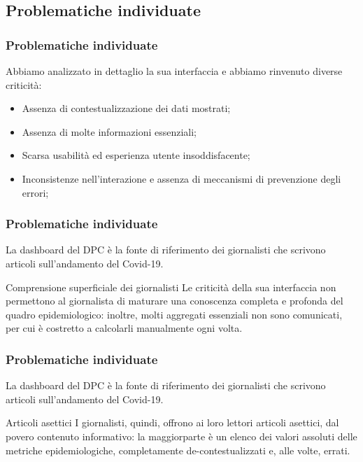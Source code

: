 \documentclass[../../main.tex]{subfiles}
\begin{document}
\subsection{Problematiche individuate}

\begin{frame}
    \frametitle{Problematiche individuate}
    Abbiamo analizzato in dettaglio la sua interfaccia e abbiamo rinvenuto diverse criticità:
    \begin{itemize}
        \item<1-> Assenza di contestualizzazione dei dati mostrati;
        \item<2-> Assenza di molte informazioni essenziali;
        \item<3-> Scarsa usabilità ed esperienza utente insoddisfacente;
        \item<4-> Inconsistenze nell'interazione e assenza di meccanismi di prevenzione degli errori;
    \end{itemize}

\end{frame}

\begin{frame}
    \frametitle{Problematiche individuate}
    La dashboard del DPC è la fonte di riferimento dei giornalisti che scrivono articoli sull'andamento del Covid-19.
    \vspace{-50pt}
    \begin{alertblock}{Comprensione superficiale dei giornalisti}
        Le criticità della sua interfaccia non permettono al giornalista di maturare una conoscenza completa e profonda del quadro epidemiologico: inoltre, molti aggregati essenziali non sono comunicati, per cui è costretto a calcolarli manualmente ogni volta.
    \end{alertblock}

\end{frame}

\begin{frame}
    \frametitle{Problematiche individuate}
    La dashboard del DPC è la fonte di riferimento dei giornalisti che scrivono articoli sull'andamento del Covid-19.
    \vspace{-50pt}
    \begin{alertblock}{Articoli asettici}
        I giornalisti, quindi, offrono ai loro lettori articoli asettici, dal povero contenuto informativo: la maggiorparte è un elenco dei valori assoluti delle metriche epidemiologiche, completamente de-contestualizzati e, alle volte, errati.
    \end{alertblock}

\end{frame}
\end{document}
